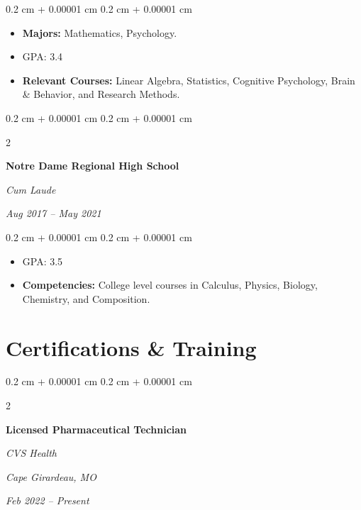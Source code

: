\documentclass[10pt, letterpaper]{article}
\newenvironment{highlights}{
    \begin{itemize}[
        topsep=0.10 cm,
        parsep=0.10 cm,
        partopsep=0pt,
        itemsep=0pt,
        leftmargin=0.4 cm + 10pt
    ]
}{
    \end{itemize}
} %
\newenvironment{onecolentry}{
    \begin{adjustwidth}{
        0.2 cm + 0.00001 cm
    }{
        0.2 cm + 0.00001 cm
    }
}{
    \end{adjustwidth}
} %
\newenvironment{twocolentry}[2][]{
    \onecolentry
    \def\secondColumn{#2}
    \setcolumnwidth{\fill, 4.5 cm}
    \begin{paracol}{2}
}{
    \switchcolumn \raggedleft \secondColumn
    \end{paracol}
    \endonecolentry
} %
\begin{document}
        \vspace{0.10 cm}

        \begin{onecolentry}
            \begin{highlights}
                \item \textbf{Majors:} Mathematics, Psychology.
                \item GPA: 3.4
                \item \textbf{Relevant Courses:} Linear Algebra, Statistics, Cognitive Psychology, Brain \& Behavior, and Research Methods.  
            \end{highlights}
        \end{onecolentry}

        
        \begin{twocolentry}{
            
            
        \textit{Aug 2017 – May 2021}}
            \textbf{Notre Dame Regional High School}

            \textit{Cum Laude}
        \end{twocolentry}

        \vspace{0.10 cm}
        \begin{onecolentry}
            \begin{highlights}
                \item GPA: 3.5 
                \item \textbf{Competencies:} College level courses in Calculus, Physics, Biology, Chemistry, and Composition.
            \end{highlights}
        \end{onecolentry}



    
    \section{Certifications \& Training}



        
        \begin{twocolentry}{
        \textit{Cape Girardeau, MO}    
            
        \textit{Feb 2022 – Present}}
            \textbf{Licensed Pharmaceutical Technician}
            
            \textit{CVS Health}
        \end{twocolentry}
\end{document}
